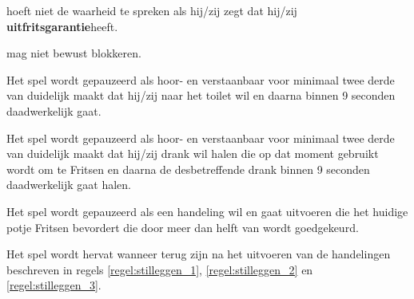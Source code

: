 \vervolgLijst{}
    \item \EenSpeler hoeft niet de waarheid te spreken als hij/zij zegt dat hij/zij \textbf{uitfritsgarantie}\footnotemark[2] heeft.
\eindLijst{}   

\vervolgLijst{}
    \item \EenSpeler mag \medeSpelers niet bewust blokkeren. 
\eindLijst{}   


\newpage
{}


\vervolgLijst{}
    \item Het spel wordt gepauzeerd als \eenSpeler hoor- en verstaanbaar voor minimaal twee derde van \alleSpelers duidelijk maakt dat hij/zij naar het toilet wil en daarna binnen 9 seconden daadwerkelijk gaat.
    \label{regel:stilleggen_1}
\eindLijst{}

\vervolgLijst{}
    \item Het spel wordt gepauzeerd als \eenSpeler hoor- en verstaanbaar voor minimaal twee derde van \alleSpelers duidelijk maakt dat hij/zij drank wil halen die op dat moment gebruikt wordt om te Fritsen en daarna de desbetreffende drank binnen 9 seconden daadwerkelijk gaat halen.
    \label{regel:stilleggen_2}
\eindLijst{}

\vervolgLijst{}
    \item Het spel wordt gepauzeerd als \eenSpeler een handeling wil en gaat uitvoeren die het huidige potje Fritsen bevordert die door meer dan helft van \alleSpelers wordt goedgekeurd.
    \label{regel:stilleggen_3}
\eindLijst{}

\vervolgLijst{}
    \item Het spel wordt hervat wanneer \alleSpelers terug zijn na het uitvoeren van de handelingen beschreven in regels \ref{regel:stilleggen_1}, \ref{regel:stilleggen_2} en \ref{regel:stilleggen_3}. 
    \label{regel:stilleggen_4}
\eindLijst{} 


